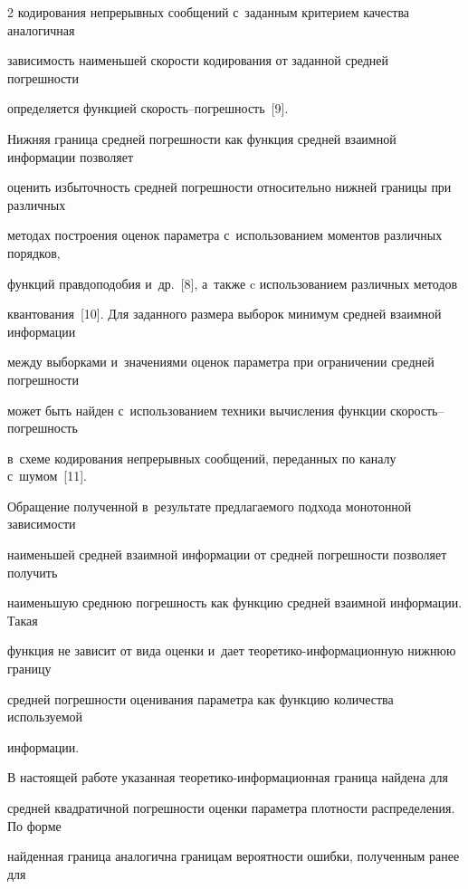\begin{multicols}{2}
кодирования непрерывных сообщений с~заданным критерием качества аналогичная 


зависимость наименьшей ско\-рости кодирования от заданной средней погрешности 


определяется функцией ско\-рость--по\-греш\-ность~[9]. 





Нижняя граница средней погрешности как функция средней взаимной информации позволяет 


оценить избыточность сред\-ней по\-греш\-ности относительно нижней границы при различных 


методах построения оценок па\-ра\-мет\-ра с~использованием моментов различных порядков, 


функций правдоподобия и~др.~[8], а~также c использованием различных методов 


квантования~[10]. Для заданного размера выборок минимум средней взаимной информации 


между выборками и~значениями оценок па\-ра\-мет\-ра при ограничении средней погрешности 


может быть найден с~использованием техники вы\-чис\-ле\-ния функции ско\-рость--по\-греш\-ность 


в~схеме кодирования непрерывных сообщений, переданных по каналу с~шумом~[11]. 


Обращение полученной в~результате пред\-ла\-га\-емо\-го подхода монотонной зависимости 


наименьшей средней взаимной информации от сред\-ней по\-греш\-ности позволяет получить 


наименьшую среднюю по\-греш\-ность как функцию средней взаимной информации. Такая 


функция не зависит от вида оценки и~дает тео\-ре\-ти\-ко-ин\-фор\-ма\-ци\-он\-ную нижнюю границу 


сред\-ней по\-греш\-ности оце\-ни\-ва\-ния па\-ра\-мет\-ра как функцию количества ис\-поль\-зу\-емой 


информации.





В настоящей работе указанная тео\-ре\-ти\-ко-ин\-фор\-ма\-ци\-он\-ная граница найдена для 


средней квад\-ра\-тич\-ной по\-греш\-ности оцен\-ки па\-ра\-мет\-ра плот\-ности распределения. По форме 


найденная \mbox{граница} аналогична границам вероятности ошибки, полученным ранее для 



\end{multicols}
